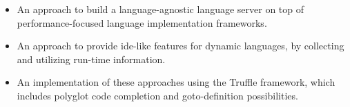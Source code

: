 \documentclass[sigplan,10pt,review,anonymous]{acmart}
\begin{document}

\begin{itemize}
\item An approach to build a language-agnostic language server on top of performance-focused language implementation frameworks.
\item An approach to provide \ac{ide}-like features for dynamic languages, by collecting and utilizing run-time information.
\item An implementation of these approaches using the Truffle framework, which
  includes polyglot code completion and goto-definition possibilities.
\end{itemize}

    
    
    
    

\end{document}
